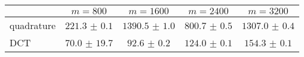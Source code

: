 \centering
\renewcommand{\arraystretch}{1.2}
\begin{tabular}{@{}lcccc@{}}
\toprule
 & $m=800$ & $m=1600$ & $m=2400$ & $m=3200$\\
\midrule
quadrature & $221.3$ $\pm$ $0.1$ & $1390.5$ $\pm$ $1.0$ & $800.7$ $\pm$ $0.5$ & $1307.0$ $\pm$ $0.4$ \\
DCT & $70.0$ $\pm$ $19.7$ & $92.6$ $\pm$ $0.2$ & $124.0$ $\pm$ $0.1$ & $154.3$ $\pm$ $0.1$ \\
\bottomrule
\end{tabular}
